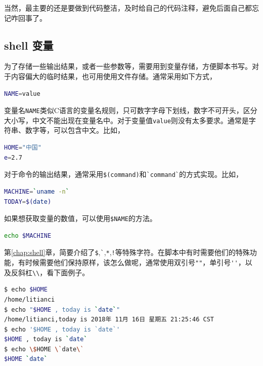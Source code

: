 \documentclass[doctor,openright,twoside]{sjtuthesis}
\newcommand{\passthrough}[1]{#1}
\theoremstyle{plain}
\theoremstyle{definition}
\theoremstyle{remark}
\theoremstyle{ocrenumbox}
\theoremstyle{plain}
\begin{document}
当然，最主要的还是要做到代码整洁，及时给自己的代码注释，避免后面自己都忘记咋回事了。

\hypertarget{shell-}{%
\subsection{shell 变量}\label{shell-}}

为了存储一些输出结果，或者一些参数等，需要用到变量存储，方便脚本书写。对于内容偏大的临时结果，也可用使用文件存储。通常采用如下方式，

\begin{lstlisting}[language=bash]
NAME=value
\end{lstlisting}

变量名\passthrough{\lstinline!NAME!}类似C语言的变量名规则，只可数字字母下划线，数字不可开头，区分大小写，中文不能出现在变量名中。对于变量值\passthrough{\lstinline!value!}则没有太多要求。通常是字符串、数字等，可以包含中文。比如，

\begin{lstlisting}[language=bash]
HOME="中国"
e=2.7
\end{lstlisting}

对于命令的输出结果，通常采用\passthrough{\lstinline!$(command)!}和\passthrough{\lstinline!`command`!}的方式实现。比如，

\begin{lstlisting}[language=bash]
MACHINE=`uname -n`
TODAY=$(date)
\end{lstlisting}

如果想获取变量的数值，可以使用\passthrough{\lstinline!$NAME!}的方法。

\begin{lstlisting}[language=bash]
echo $MACHINE
\end{lstlisting}

第\ref{chap:shell}章，简要介绍了\passthrough{\lstinline!$!},\passthrough{\lstinline!`!},\passthrough{\lstinline!*!},\passthrough{\lstinline"!"}等特殊字符。在脚本中有时需要他们的特殊功能，有时候需要他们保持原样，该怎么做呢，通常使用双引号\passthrough{\lstinline!""!}，单引号\passthrough{\lstinline!''!}，以及反斜杠\passthrough{\lstinline!\\!}，看下面例子。

\begin{lstlisting}[language=bash]
$ echo $HOME
/home/litianci
$ echo "$HOME , today is `date`"
/home/litianci,today is 2018年 11月 16日 星期五 21:25:46 CST
$ echo '$HOME , today is `date`'
$HOME , today is `date`
$ echo \$HOME \`date\`
$HOME `date`
\end{lstlisting}
\end{document}
